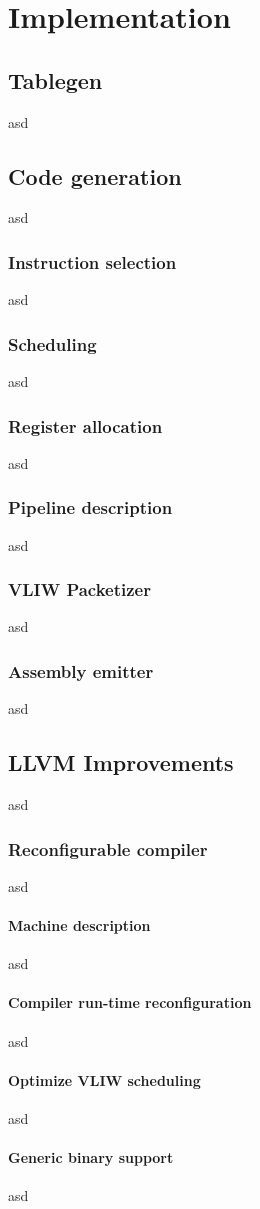 \chapter{Implementation}
\section{Tablegen}
asd

\section{Code generation}
asd
\subsection{Instruction selection}
asd
\subsection{Scheduling}
asd
\subsection{Register allocation}
asd
\subsection{Pipeline description}
asd
\subsection{VLIW Packetizer}
asd
\subsection{Assembly emitter}
asd

\section{LLVM Improvements}
asd
\subsection{Reconfigurable compiler}
asd
\subsubsection{Machine description}
asd
\subsubsection{Compiler run-time reconfiguration}
asd
\subsubsection{Optimize VLIW scheduling}
asd
\subsubsection{Generic binary support}
asd


\acresetall
